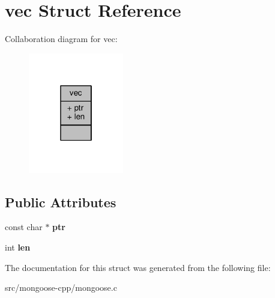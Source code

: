 \hypertarget{structvec}{}\section{vec Struct Reference}
\label{structvec}


Collaboration diagram for vec\+:
\nopagebreak
\begin{figure}[H]
\begin{center}
\leavevmode
\includegraphics[width=118pt]{dc/d79/structvec__coll__graph}
\end{center}
\end{figure}
\subsection*{Public Attributes}
\begin{DoxyCompactItemize}
\item 
const char $\ast$ {\bfseries ptr}\hypertarget{structvec_ae8b8fdc00d1598d046d14d0ae73a441a}{}\label{structvec_ae8b8fdc00d1598d046d14d0ae73a441a}

\item 
int {\bfseries len}\hypertarget{structvec_af52266b373688d591406b7d465ad019c}{}\label{structvec_af52266b373688d591406b7d465ad019c}

\end{DoxyCompactItemize}


The documentation for this struct was generated from the following file\+:\begin{DoxyCompactItemize}
\item 
src/mongoose-\/cpp/mongoose.\+c\end{DoxyCompactItemize}
